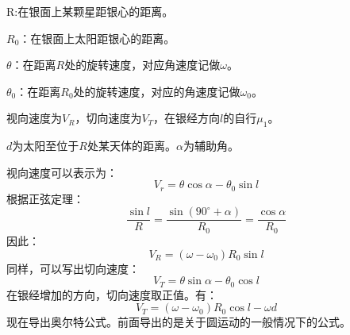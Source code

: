 R:在银面上某颗星距银心的距离。

$R_{0}$：在银面上太阳距银心的距离。

$\theta$：在距离$R$处的旋转速度，对应角速度记做$\omega$。

$\theta_{0}$：在距离$R_{0}$处的旋转速度，对应的角速度记做$\omega_{0}$。

视向速度为$V_{R}$，切向速度为$V_{T}$，在银经方向$l$的自行$\mu_{1}$。

$d$为太阳至位于$R$处某天体的距离。$\alpha$为辅助角。

视向速度可以表示为：
\begin{equation}
	V_{r}=\theta\cos \alpha-\theta_{0}\sin l
\end{equation}
根据正弦定理：
\begin{equation}
	\frac{\sin l}{R}=\frac{\sin\left(90^\circ+\alpha\right)}{R_{0}}=\frac{\cos\alpha}{R_{0}}
\end{equation}
因此：
\begin{equation}
	V_{R}=\left(\omega-\omega_{0}\right)R_{0}\sin l
\end{equation}
同样，可以写出切向速度：
\begin{equation}
	V_{T}=\theta\sin\alpha-\theta_{0}\cos l
\end{equation}
在银经增加的方向，切向速度取正值。有：
\begin{equation}
	V_{T}=\left(\omega-\omega_{0}\right)R_{0}\cos l-\omega d
\end{equation}
现在导出奥尔特公式。前面导出的是关于圆运动的一般情况下的公式。

